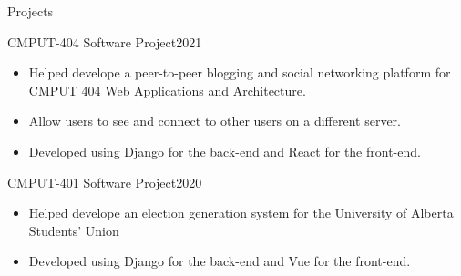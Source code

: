 \documentclass[]{mcdowellcv}
\begin{document}
\vspace*{-10pt}
\begin{cvsection}{Projects}
  \begin{cvsubsection}{CMPUT-404 Software Project}{}{2021}
    \vspace*{8pt}
    \begin{itemize}
      \item Helped develope a peer-to-peer blogging and social networking platform for CMPUT 404 Web Applications and Architecture.
      \item Allow users to see and connect to other users on a different server. 
      \item Developed using Django for the back-end and React for the front-end. 
    \end{itemize}
  \end{cvsubsection}

  \begin{cvsubsection}{CMPUT-401 Software Project}{}{2020}
    \vspace*{8pt}
    \begin{itemize}
      \item Helped develope an election generation system for the University of Alberta Students' Union
      \item Developed using Django for the back-end and Vue for the front-end.
    \end{itemize}
  \end{cvsubsection}
\end{cvsection}
\end{document}
